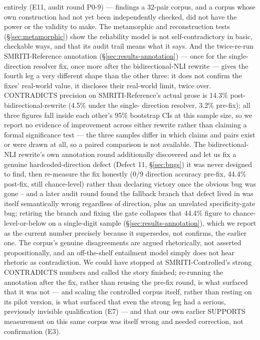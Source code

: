 entirely (E11, audit round P0-9) --- findings a 32-pair corpus, and a
corpus whose own construction had not yet been independently checked,
did not have the power or the validity to make. The metamorphic and reconstruction tests
(\S\ref{sec:metamorphic}) show the reliability model is not
self-contradictory in basic, checkable ways, and that its audit trail
means what it says. And the twice-re-run SMRITI-Reference annotation
(\S\ref{sec:results-annotation}) --- once for the single-direction
resolver fix, once more after the bidirectional-NLI rewrite --- gives the
fourth leg a very different shape than the other three: it does not
confirm the fixes' real-world value, it discloses their real-world
limit, twice over. CONTRADICTS precision on SMRITI-Reference's actual
prose is 14.3\% post-bidirectional-rewrite (4.5\% under the single-
direction resolver, 3.2\% pre-fix); all three figures fall inside each
other's 95\% bootstrap CIs at this sample size, so we report no evidence
of improvement across either rewrite rather than claiming a formal
significance test --- the three samples differ in which claims and pairs
exist or were drawn at all, so a paired comparison is not available. The
bidirectional-NLI rewrite's own annotation round additionally discovered
and let us fix a genuine hardcoded-direction defect (Defect 11,
\S\ref{sec:bugs}) it was never designed to find, then re-measure the fix
honestly (0/9 direction accuracy pre-fix, 44.4\% post-fix, still
chance-level) rather than declaring victory once the obvious bug was
gone -- and a later audit round found the fallback branch that
defect lived in was itself semantically wrong regardless of direction,
plus an unrelated specificity-gate bug; retiring the branch and fixing
the gate collapses that 44.4\% figure to chance-level-or-below on a
single-digit sample (\S\ref{sec:results-annotation}), which we report as
the current number precisely because it supersedes, not confirms, the
earlier one. The corpus's genuine disagreements are argued rhetorically, not asserted
propositionally, and an off-the-shelf entailment model simply does not
hear rhetoric as contradiction. We could have stopped at
SMRITI-Controlled's strong CONTRADICTS numbers and called the story
finished; re-running the annotation after the fix, rather than reusing
the pre-fix round, is what surfaced that it was not --- and scaling the
controlled corpus itself, rather than resting on its pilot version, is
what surfaced that even the strong leg had a serious, previously
invisible qualification (E7) --- and that our own earlier SUPPORTS
measurement on this same corpus was itself wrong and needed correction,
not confirmation (E3).

